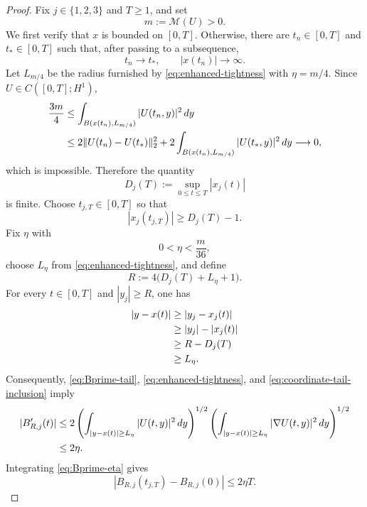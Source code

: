 \documentclass[10pt,a4paper]{amsart}
\newcommand{\Mcal}{\mathcal M}
\newcommand{\dd}{\,d}
\begin{document}
\begin{proof}
Fix $j\in\{1,2,3\}$ and $T\ge1$, and set
\begin{equation*}
  m:=\Mcal(U)>0.
\end{equation*}
We first verify that $x$ is bounded on $[0,T]$. Otherwise, there are $t_n\in[0,T]$ and $t_*\in[0,T]$ such that, after passing to a subsequence,
\begin{equation*}
  t_n\to t_*,
  \qquad |x(t_n)|\to\infty.
\end{equation*}
Let $L_{m/4}$ be the radius furnished by \eqref{eq:enhanced-tightness} with $\eta=m/4$. Since $U\in C([0,T];H^1)$,
\begin{align*}
  \frac{3m}{4}
  &\le\int_{B(x(t_n),L_{m/4})}|U(t_n,y)|^2\dd y\notag\\
  &\le2\|U(t_n)-U(t_*)\|_2^2
  +2\int_{B(x(t_n),L_{m/4})}|U(t_*,y)|^2\dd y
  \longrightarrow0,
\end{align*}
which is impossible. Therefore the quantity
\begin{equation*}
  D_j(T):=\sup_{0\le t\le T}|x_j(t)|
\end{equation*}
is finite. Choose $t_{j,T}\in[0,T]$ so that
\begin{equation}\label{eq:Dj-almost-max}
  |x_j(t_{j,T})|\ge D_j(T)-1.
\end{equation}
Fix $\eta$ with
\begin{equation}\label{eq:eta-small-for-drift}
  0<\eta<\frac{m}{36},
\end{equation}
choose $L_\eta$ from \eqref{eq:enhanced-tightness}, and define
\begin{equation}\label{eq:R-barycenter-choice}
  R:=4\bigl(D_j(T)+L_\eta+1\bigr).
\end{equation}
For every $t\in[0,T]$ and $|y_j|\ge R$, one has
\begin{align}
  |y-x(t)|
  &\ge |y_j-x_j(t)|
\notag\\
  &\ge |y_j|-|x_j(t)|
\notag\\
  &\ge R-D_j(T)
\notag\\
  &\ge L_\eta.
  \label{eq:coordinate-tail-inclusion}
\end{align}
Consequently, \eqref{eq:Bprime-tail}, \eqref{eq:enhanced-tightness}, and \eqref{eq:coordinate-tail-inclusion} imply
\begin{align}
  |B_{R,j}'(t)|
  &\le2
  \left(\int_{|y-x(t)|\ge L_\eta}|U(t,y)|^2\dd y\right)^{1/2}
  \left(\int_{|y-x(t)|\ge L_\eta}|\nabla U(t,y)|^2\dd y\right)^{1/2}\notag\\
  &\le2\eta.
  \label{eq:Bprime-eta}
\end{align}
Integrating \eqref{eq:Bprime-eta} gives
\begin{equation}\label{eq:B-difference-small}
  |B_{R,j}(t_{j,T})-B_{R,j}(0)|\le2\eta T.
\end{equation}


\end{proof}
\end{document}
